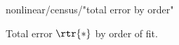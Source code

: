 
\begin{figure}[htbp] %
   \centering
   \begin{overpic}[ scale = \myscale ]
	   {\pathgraphics nonlinear/census/"total error by order"}
    \end{overpic}
      \caption{Total error $\rtr{*}$ by order of fit.}
\end{figure}
    
